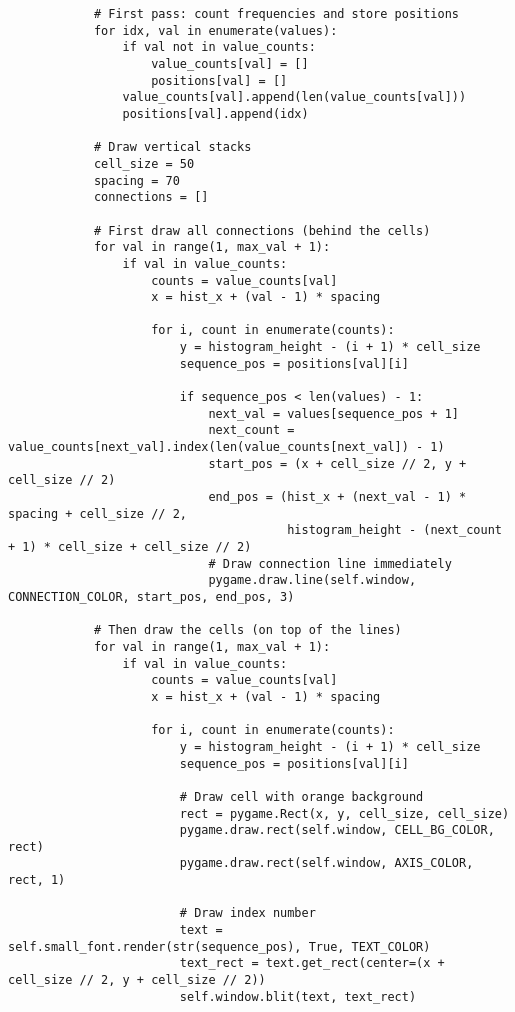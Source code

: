 \begin{lstlisting}
            # First pass: count frequencies and store positions
            for idx, val in enumerate(values):
                if val not in value_counts:
                    value_counts[val] = []
                    positions[val] = []
                value_counts[val].append(len(value_counts[val]))
                positions[val].append(idx)

            # Draw vertical stacks
            cell_size = 50
            spacing = 70
            connections = []

            # First draw all connections (behind the cells)
            for val in range(1, max_val + 1):
                if val in value_counts:
                    counts = value_counts[val]
                    x = hist_x + (val - 1) * spacing

                    for i, count in enumerate(counts):
                        y = histogram_height - (i + 1) * cell_size
                        sequence_pos = positions[val][i]

                        if sequence_pos < len(values) - 1:
                            next_val = values[sequence_pos + 1]
                            next_count = value_counts[next_val].index(len(value_counts[next_val]) - 1)
                            start_pos = (x + cell_size // 2, y + cell_size // 2)
                            end_pos = (hist_x + (next_val - 1) * spacing + cell_size // 2,
                                       histogram_height - (next_count + 1) * cell_size + cell_size // 2)
                            # Draw connection line immediately
                            pygame.draw.line(self.window, CONNECTION_COLOR, start_pos, end_pos, 3)

            # Then draw the cells (on top of the lines)
            for val in range(1, max_val + 1):
                if val in value_counts:
                    counts = value_counts[val]
                    x = hist_x + (val - 1) * spacing

                    for i, count in enumerate(counts):
                        y = histogram_height - (i + 1) * cell_size
                        sequence_pos = positions[val][i]

                        # Draw cell with orange background
                        rect = pygame.Rect(x, y, cell_size, cell_size)
                        pygame.draw.rect(self.window, CELL_BG_COLOR, rect)
                        pygame.draw.rect(self.window, AXIS_COLOR, rect, 1)

                        # Draw index number
                        text = self.small_font.render(str(sequence_pos), True, TEXT_COLOR)
                        text_rect = text.get_rect(center=(x + cell_size // 2, y + cell_size // 2))
                        self.window.blit(text, text_rect)


\end{lstlisting}
